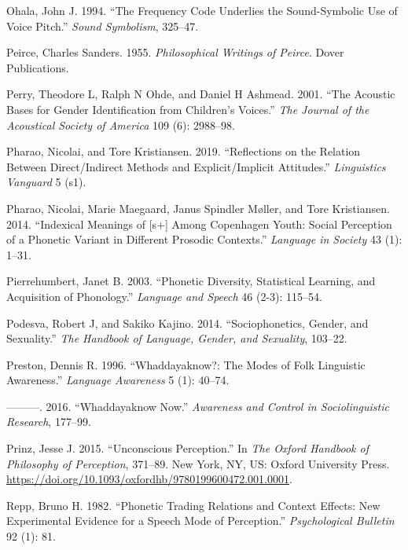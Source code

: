 \documentclass[
  letterpaper,
  DIV=11,
  numbers=noendperiod]{scrartcl}
\newlength{\cslhangindent}
\newenvironment{CSLReferences}[2] %
 {\begin{list}{}{%
  \setlength{\itemindent}{0pt}
  \setlength{\leftmargin}{0pt}
  \setlength{\parsep}{0pt}
  \ifodd #1
   \setlength{\leftmargin}{\cslhangindent}
   \setlength{\itemindent}{-1\cslhangindent}
  \fi
  \setlength{\itemsep}{#2\baselineskip}}}
 {\end{list}}
\begin{document}
\begin{CSLReferences}{1}{0}
Ohala, John J. 1994. {``The Frequency Code Underlies the Sound-Symbolic
Use of Voice Pitch.''} \emph{Sound Symbolism}, 325--47.

Peirce, Charles Sanders. 1955. \emph{Philosophical Writings of Peirce}.
Dover Publications.

Perry, Theodore L, Ralph N Ohde, and Daniel H Ashmead. 2001. {``The
Acoustic Bases for Gender Identification from Children's Voices.''}
\emph{The Journal of the Acoustical Society of America} 109 (6):
2988--98.

Pharao, Nicolai, and Tore Kristiansen. 2019. {``Reflections on the
Relation Between Direct/Indirect Methods and Explicit/Implicit
Attitudes.''} \emph{Linguistics Vanguard} 5 (s1).

Pharao, Nicolai, Marie Maegaard, Janus Spindler Møller, and Tore
Kristiansen. 2014. {``Indexical Meanings of {[}s+{]} Among Copenhagen
Youth: Social Perception of a Phonetic Variant in Different Prosodic
Contexts.''} \emph{Language in Society} 43 (1): 1--31.

Pierrehumbert, Janet B. 2003. {``Phonetic Diversity, Statistical
Learning, and Acquisition of Phonology.''} \emph{Language and Speech} 46
(2-3): 115--54.

Podesva, Robert J, and Sakiko Kajino. 2014. {``Sociophonetics, Gender,
and Sexuality.''} \emph{The Handbook of Language, Gender, and
Sexuality}, 103--22.

Preston, Dennis R. 1996. {``Whaddayaknow?: The Modes of Folk Linguistic
Awareness.''} \emph{Language Awareness} 5 (1): 40--74.

---------. 2016. {``Whaddayaknow Now.''} \emph{Awareness and Control in
Sociolinguistic Research}, 177--99.

Prinz, Jesse J. 2015. {``Unconscious Perception.''} In \emph{The
{Oxford} Handbook of Philosophy of Perception}, 371--89. New York, NY,
US: Oxford University Press.
\url{https://doi.org/10.1093/oxfordhb/9780199600472.001.0001}.

Repp, Bruno H. 1982. {``Phonetic Trading Relations and Context Effects:
New Experimental Evidence for a Speech Mode of Perception.''}
\emph{Psychological Bulletin} 92 (1): 81.


\end{CSLReferences}
\end{document}

